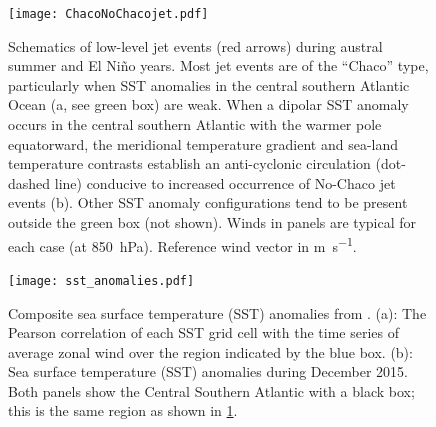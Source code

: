 \documentclass{ametsoc}
\begin{document}
\begin{figure}
	\noindent\texttt{[image: ChacoNoChacojet.pdf]}
	\caption{
		Schematics of low-level jet events (red arrows) during austral summer and El Ni\~no years.
		Most jet events are of the ``Chaco'' type, particularly when SST anomalies in the central southern Atlantic Ocean (a, see green box) are weak.
		When a dipolar SST anomaly occurs in the central southern Atlantic with the warmer pole equatorward, the meridional temperature gradient and sea-land temperature contrasts establish an anti-cyclonic circulation (dot-dashed line) conducive to increased occurrence of No-Chaco jet events (b).
		Other SST anomaly configurations tend to be present outside the green box (not shown).
		Winds in panels are typical for each case (at \SI{850}{\hecto\pascal}).
		Reference wind vector in \si{\meter\per\second}.
	}\label{fig:chaco-nochaco}
\end{figure}

\begin{figure}
	\noindent\texttt{[image: sst\_anomalies.pdf]}
	\caption{
		Composite sea surface temperature (SST) anomalies from \citet{Reynolds:2002iy}.
		(a): The Pearson correlation of each SST grid cell with the time series of average zonal wind over the region indicated by the blue box.
		(b): Sea surface temperature (SST) anomalies during December 2015.
		Both panels show the Central Southern Atlantic with a black box; this is the same region as shown in \cref{fig:chaco-nochaco}.
	}\label{fig:wt4-months}
\end{figure}
\end{document}
